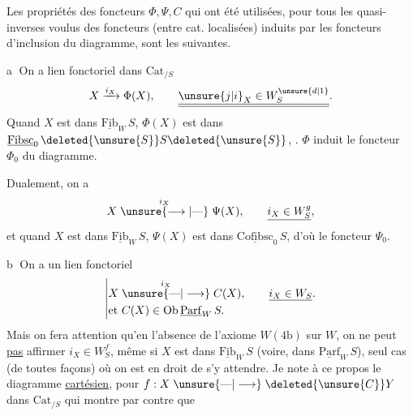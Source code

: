 Les propriétés des foncteurs $\Phi,\Psi,C$ qui ont été
utilisées, pour  tous les quasi-inverses
voulus des foncteurs (entre cat. localisées) induits par les foncteurs d'inclusion du diagramme, sont les suivantes.

\textcircled{a} On a  lien fonctoriel dans $\mathrm{Cat}_{/S}$
\[
X\xrightarrow{i_X}\Phi(X),\qquad \underline{\underline{\unsure{j|i}_X\in W_S^{\unsure{d|1}}}} .
\]
 Quand $X$ est dans $\underline{\mathrm{Fib}}_W\,S$,
$\Phi(X)$ est dans $\underline{\mathrm{Fibsc}}_0\,\deleted{\unsure{S}}S\deleted{\unsure{S}}$,
.
 $\Phi$ induit le foncteur $\Phi_0$ du diagramme.

Dualement, on a
\[
X\mathrel{\overset{i_X}{\unsure{\longrightarrow|\text{---}}}}\Psi(X),
\qquad\underline{i_X\in W_S^g},
\]
et quand $X$ est dans $\underline{\mathrm{Fib}}_W\,S$, $\Psi(X)$ est dans
$\underline{\mathrm{Cofibsc}}_0\,S$, d'où le foncteur $\Psi_0$.

\textcircled{b} On a un lien fonctoriel
\[
\left|\begin{aligned}
&X\mathrel{\overset{i_X}{\unsure{\text{---}|\longrightarrow}}}C(X),\qquad\underline{i_X\in W_S}.\\
&\text{et }C(X)\in\mathrm{Ob}\,\underline{\mathrm{Parf}}_W\,S .
\end{aligned}\right.
\]
Mais on fera attention qu'en l'absence de l'axiome
\margin{$\vert\vert\vert$}$W(4\mathrm{b})$ sur $W$, on ne peut \uline{pas} affirmer $i_X\in W_S^f$,
même si $X$ est dans $\underline{\mathrm{Fib}}_W\,S$ (voire, dans $\underline{\mathrm{Parf}}_W\,S$),
seul cas (de toutes façons) où on est en droit de s'y
attendre. Je note à ce propos le diagramme \uline{cartésien},
pour $f:X\mathrel{\unsure{\text{---}|\longrightarrow}}\deleted{\unsure{C}}Y$ dans $\mathrm{Cat}_{/S}$
qui montre par contre que 
